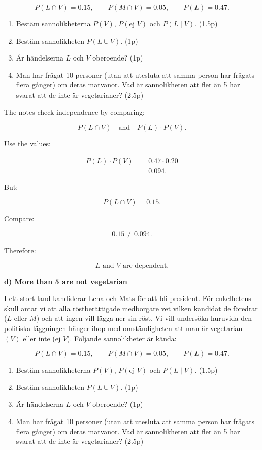 \documentclass[10pt]{article}
\begin{document}
\[
P(L\cap V)=0.15,
\qquad
P(M\cap V)=0.05,
\qquad
P(L)=0.47.
\]

\begin{enumerate}[label=\alph*)]
\item Bestäm sannolikheterna
\(P(V)\), \(P(\text{ej }V)\) och \(P(L\mid V)\).
\hfill (1.5p)

\item Bestäm sannolikheten \(P(L\cup V)\).
\hfill (1p)

\item Är händelserna \(L\) och \(V\) oberoende?
\hfill (1p)

\item Man har frågat 10 personer (utan att utesluta
att samma person har frågats flera gånger) om deras
matvanor.
Vad är sannolikheten att fler än 5 har svarat att de
inte är vegetarianer?
\hfill (2.5p)
\end{enumerate}

The notes check independence by comparing:

\[
P(L\cap V)
\quad \text{and} \quad
P(L)\cdot P(V).
\]

Use the values:

\begin{align*}
P(L)\cdot P(V)
&=0.47\cdot 0.20 \\[2mm]
&=0.094.
\end{align*}

But:

\[
P(L\cap V)=0.15.
\]

Compare:

\[
0.15\neq 0.094.
\]

Therefore:

\[
L \text{ and } V
\text{ are dependent.}
\]

\textbf{d) More than 5 are not vegetarian}

I ett stort land kandiderar Lena och Mats för att
bli president.
För enkelhetens skull antar vi att alla
röstberättigade medborgare vet vilken kandidat de
föredrar (\(L\) eller \(M\)) och att ingen vill lägga
ner sin röst.
Vi vill undersöka huruvida den politiska läggningen
hänger ihop med omständigheten att man är vegetarian
\((V)\) eller inte (ej \(V\)).
Följande sannolikheter är kända:

\[
P(L\cap V)=0.15,
\qquad
P(M\cap V)=0.05,
\qquad
P(L)=0.47.
\]

\begin{enumerate}[label=\alph*)]
\item Bestäm sannolikheterna
\(P(V)\), \(P(\text{ej }V)\) och \(P(L\mid V)\).
\hfill (1.5p)

\item Bestäm sannolikheten \(P(L\cup V)\).
\hfill (1p)

\item Är händelserna \(L\) och \(V\) oberoende?
\hfill (1p)

\item Man har frågat 10 personer (utan att utesluta
att samma person har frågats flera gånger) om deras
matvanor.
Vad är sannolikheten att fler än 5 har svarat att de
inte är vegetarianer?
\hfill (2.5p)
\end{enumerate}
\end{document}
